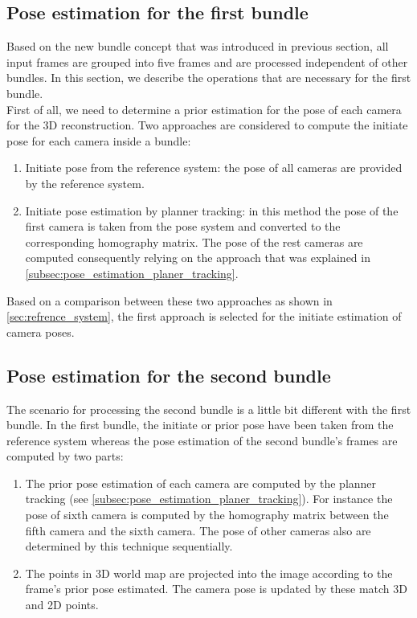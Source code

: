 \subsection{Pose estimation for the first bundle}\label{subsec:pose_first_bundle}

Based on the new bundle concept that was introduced in previous section, all input frames are grouped into five frames and are processed independent of other bundles. In this section, we describe the operations that are necessary for the first bundle.\\
First of all, we need to determine a prior estimation for the pose of each camera for the 3D reconstruction. Two approaches are considered to compute the initiate pose for each camera inside a bundle:
\begin{enumerate}
\item Initiate pose from the reference system: the pose of all cameras are provided by the reference system.
\item Initiate pose estimation by planner tracking: in this method the pose of the first camera is taken from the pose system and converted to the corresponding homography matrix. The pose of the rest cameras are computed consequently relying on the approach that was explained in \autoref{subsec:pose_estimation_planer_tracking}.
\end{enumerate}
Based on a comparison between these two approaches as shown in \autoref{sec:refrence_system}, the first approach is selected for the initiate estimation of camera poses.\\




\subsection{Pose estimation for the second bundle} \label{subsec:pose_second_bundle}
The scenario for processing the second bundle is a little bit different with the first bundle. In the first bundle, the initiate or prior pose have been taken from the reference system whereas the pose estimation of the second bundle's frames are computed by two parts:
\begin{enumerate}
\item The prior pose estimation of each camera are computed by the planner tracking (see \autoref{subsec:pose_estimation_planer_tracking}). For instance the pose of sixth camera is computed by the homography matrix between the fifth camera and the sixth camera. The pose of other cameras also are determined by this technique sequentially. 
\item The points in 3D world map are projected into the image according to the frame's prior pose estimated. The camera pose is updated by these match 3D and 2D points.
\end{enumerate}

